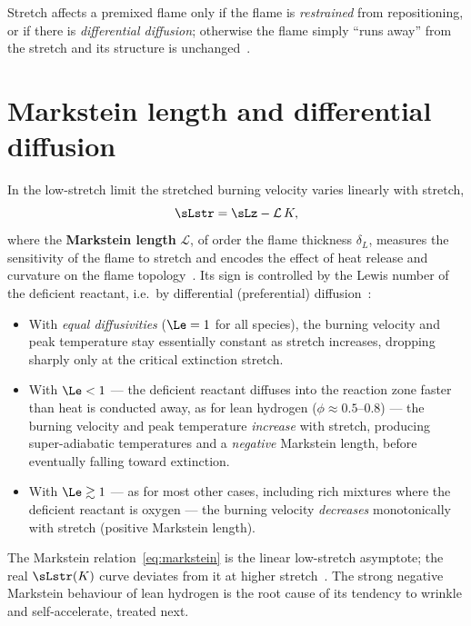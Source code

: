 \begin{keybox}
Stretch affects a premixed flame only if the flame is \emph{restrained} from repositioning, or if there is \emph{differential diffusion}; otherwise the flame simply ``runs away'' from the stretch and its structure is unchanged~\cite{lecture9}.
\end{keybox}

\section{Markstein length and differential diffusion}

In the low-stretch limit the stretched burning velocity varies linearly with stretch,
\begin{equation}
\sLstr=\sLz-\mathcal{L}\,K ,
\label{eq:markstein}
\end{equation}
where the \textbf{Markstein length} $\mathcal{L}$, of order the flame thickness $\delta_L$, measures the sensitivity of the flame to stretch and encodes the effect of heat release and curvature on the flame topology~\cite{lecture9,Law1988}. Its sign is controlled by the Lewis number of the deficient reactant, i.e.\ by differential (preferential) diffusion~\cite{transcript_l9,lecture9}:
\begin{itemize}[leftmargin=1.5em,itemsep=2pt]
\item With \emph{equal diffusivities} ($\Le=1$ for all species), the burning velocity and peak temperature stay essentially constant as stretch increases, dropping sharply only at the critical extinction stretch.
\item With $\Le<1$ --- the deficient reactant diffuses into the reaction zone faster than heat is conducted away, as for lean hydrogen ($\phi\approx0.5$--$0.8$) --- the burning velocity and peak temperature \emph{increase} with stretch, producing super-adiabatic temperatures and a \emph{negative} Markstein length, before eventually falling toward extinction.
\item With $\Le\gtrsim1$ --- as for most other cases, including rich mixtures where the deficient reactant is oxygen --- the burning velocity \emph{decreases} monotonically with stretch (positive Markstein length).
\end{itemize}
The Markstein relation~\eqref{eq:markstein} is the linear low-stretch asymptote; the real $\sLstr(K)$ curve deviates from it at higher stretch~\cite{lecture9,transcript_l9}. The strong negative Markstein behaviour of lean hydrogen is the root cause of its tendency to wrinkle and self-accelerate, treated next.

